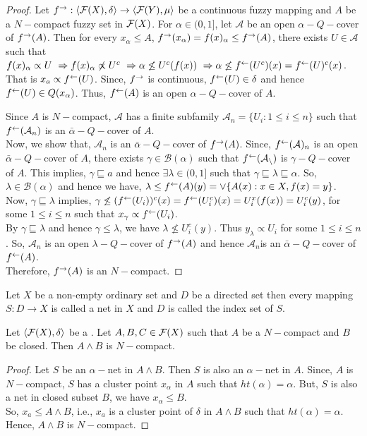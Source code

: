 \documentclass[../main-sheet.tex]{subfiles}
\begin{document}
\begin{proof}
    Let \(f^{\rightarrow}:\langle \mathcal{F}(X), \delta \rangle\to\langle \mathcal{F}(Y),\mu\rangle\) be a continuous fuzzy mapping and \(A \) be a \(N-\)compact fuzzy set in \(\mathcal{F}(X)\). For \(\alpha\in(0,1]\), let \(\mathcal{A }\) be an open \(\alpha-Q-\)cover of \(f^{\rightarrow}(A)\). Then for every \(x_\alpha\leq A \), \(f^{\rightarrow}(x_\alpha)=f(x)_\alpha\leq f^{\rightarrow}(A)\), there exists \(U\in \mathcal{A }\) such that \(f(x)_\alpha\propto U  \,\,\Rightarrow f(x)_\alpha\not\propto U^c \,\,\Rightarrow \alpha\not\leq U^c(f(x))\,\,\Rightarrow\alpha\not\leq f^{\leftarrow}(U^c)(x)=f^{\leftarrow}(U)^c(x)\). That is \(x_a\propto f^{\leftarrow}(U)\). Since, \(f^{\rightarrow} \) is continuous, \(f^{\leftarrow}(U)\in\delta\) and hence \(f^{\leftarrow}(U)\in Q(x_\alpha)\). Thus, \(f^{\leftarrow}(A )\) is an open \(\alpha-Q-\)cover of \(A \).

    Since \(A \) is \(N-\)compact, \(\mathcal{A }\) has a finite subfamily \(\mathcal{A}_n=\{U_i:1\leq i\leq n\}\) such that \(f^{\leftarrow}(\mathcal{A}_n )\) is an \(\bar{\alpha}-Q-\)cover of \(A\).\\


    Now, we show that, \(\mathcal{A }_n\) is an \(\bar{\alpha}-Q-\)cover of \(f^{\rightarrow}(A)\). Since, \(f^{\leftarrow}(\mathcal{A})_n\) is an open \(\bar{\alpha}-Q-\)cover of \(A \), there exists \(\gamma\in \mathcal{B }(\alpha)\) such that \(f^{\leftarrow}(\mathcal{A_n })\) is \(\gamma-Q-\)cover of \(A \). This implies, \(\gamma \sqsubseteq  a\) and hence \(\exists \lambda\in(0,1]\) such that \(\gamma\sqsubseteq \lambda\sqsubseteq\alpha\). So, \(\lambda\in\mathcal{B }(\alpha)\) and hence we have, \(\lambda\leq f^{\leftarrow}(A)(y)=\vee\{A(x):x\in X, f(x)=y \}\). Now, \(\gamma\sqsubseteq \lambda\) implies, \(\gamma\not\leq(f^{\leftarrow}(U_i))^c(x)=f^{\leftarrow}(U_i^c)(x)=U_i^x(f(x))=U_i^c(y)\), for some \(1\leq i\leq n\) such that \(x_\gamma\propto f^{\leftarrow}(U_i) \).\\
    By \(\gamma\sqsubseteq \lambda\) and hence \(\gamma\leq \lambda\), we have \(\lambda\not\leq U_i^c(y )\). Thus \(y_\lambda\propto U_i \) for some \(1\leq i\leq n \). So, \(\mathcal{A }_n \) is an open \(\lambda-Q-\)cover of \(f^{\rightarrow}(A )\)  and hence \(\mathcal{A }_n \)is an \(\bar{\alpha}-Q-\)cover of \(f^{\leftarrow}(A )\).\\
    Therefore, \(f^{\rightarrow}(A )\) is an \(N-\)compact.
\end{proof}
\begin{defn}[Net in \(X \)]
    Let \(X \) be a non-empty ordinary set and \(D \) be a directed set then every mapping \(S:D\to X \) is called a net in \(X \) and \(D \) is called the index set of \(S \).
\end{defn}
\begin{thm}
    Let \(\langle \mathcal{F}(X), \delta \rangle\) be a \fts. Let \(A,B,C\in\mathcal{F}(X) \) such that \(A \) be a \(N-\)compact and \(B \) be closed. Then \(A\wedge B \) is \(N-\)compact.
\end{thm}
\begin{proof}
    Let \(S \) be an \(\alpha-\)net in \(A\wedge B \). Then \(S \) is also an \(\alpha-\)net in \(A \). Since, \(A \) is \(N-\)compact, \(S \) has a cluster point \(x_\alpha\) in \(A \) such that \(ht(\alpha)=\alpha\). But, \(S \) is also a net in closed subset \(B \), we have \(x_\alpha\leq B \).\\
    So, \(x_a\leq A\wedge B \), i.e., \(x_a \) is a cluster point of \(\delta\) in \(A\wedge B \) such that \(ht(\alpha)=\alpha\). Hence, \(A\wedge B \) is \(N-\)compact.
\end{proof}
\end{document}
